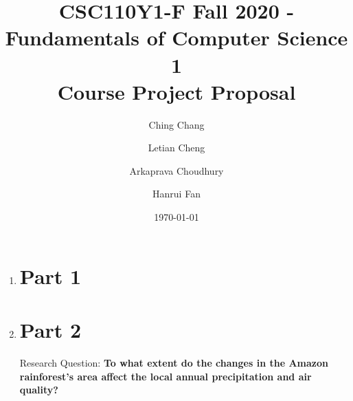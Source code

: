 \documentclass[12pt]{article}
\title{CSC110Y1-F Fall 2020 - Fundamentals of Computer Science 1 \\ Course Project Proposal}
\author{
  Ching Chang\\
  \and
  Letian Cheng\\
  \and
  Arkaprava Choudhury\\
  \and
  Hanrui Fan
}
\date{\today}
\begin{document}
\maketitle

\newpage


\begin{enumerate}
\item \section*{Part 1}

\newpage

\item \section*{Part 2}

\begin{text}
Research Question: \textbf{To what extent do the changes in the Amazon rainforest’s area affect the local annual precipitation and air quality?}


\end{text}
\end{enumerate}
\end{document}
